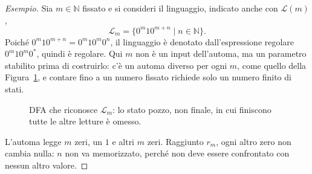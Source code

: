 \documentclass[a4paper, 11pt, oneside]{book}
\theoremstyle{formale}
\newenvironment{esempio}
    {\begin{proof}[\textit{Esempio}]\renewcommand{\qedsymbol}{$\diamond$}}
    {\end{proof}}
\begin{document}
    \begin{esempio}
        Sia $m \in \mathbb{N}$ fissato e si consideri il linguaggio, indicato anche con
        $\mathcal{L}(m)$,
        \begin{equation*}
            \mathcal{L}_m = \{0^m 1 0^{m+n} \mid n \in \mathbb{N}\}.
        \end{equation*}
        Poich\'e $0^m 1 0^{m+n} = 0^m 1 0^m 0^n$, il linguaggio \`e denotato
        dall'espressione regolare $0^m 1 0^m 0^*$, quindi \`e regolare. Qui $m$ non \`e un
        input dell'automa, ma un parametro stabilito prima di costruirlo: c'\`e un automa
        diverso per ogni $m$, come quello della Figura~\ref{fig:dfa-lm}, e contare fino a
        un numero fissato richiede solo un numero finito di stati.

        \begin{figure}[H]
            \centering
            \caption{DFA che riconosce $\mathcal{L}_m$: lo stato pozzo, non finale, in cui
                finiscono tutte le altre letture \`e omesso.}
            \label{fig:dfa-lm}
        \end{figure}

        L'automa legge $m$ zeri, un $1$ e altri $m$ zeri. Raggiunto $r_m$, ogni altro zero
        non cambia nulla: $n$ non va memorizzato, perch\'e non deve essere confrontato con
        nessun altro valore.
    \end{esempio}
\end{document}
